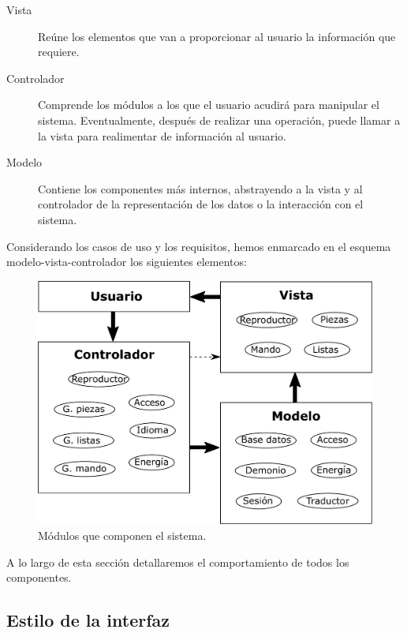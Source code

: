 \smallskip

\begin{description}
	\item[Vista] Reúne los elementos que van a proporcionar al usuario la información que requiere.
	\item[Controlador] Comprende los módulos a los que el usuario acudirá para manipular el sistema. Eventualmente, después de realizar una operación, puede llamar a la vista para realimentar de información al usuario. 
	\item[Modelo] Contiene los componentes más internos, abstrayendo a la vista y al controlador de la representación de los datos o la interacción con el sistema.
\end{description}

Considerando los casos de uso y los requisitos, hemos enmarcado en el esquema modelo-vista-controlador los siguientes elementos:

\smallskip

\begin{figure}[H]
	\noindent \begin{centering}
		\includegraphics[width=\linewidth*2/3]{capitulo4/mvc_completo}
		\par\end{centering}
	\smallskip
	\caption{\label{fig:mvc_completo} Módulos que componen el sistema.}
\end{figure} 

\smallskip

A lo largo de esta sección detallaremos el comportamiento de todos los componentes.

\subsection{Estilo de la interfaz}

